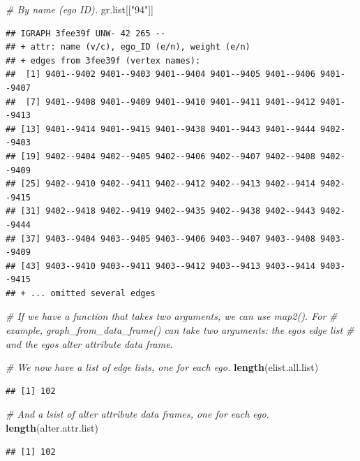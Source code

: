 \documentclass[
]{book}
\newenvironment{Shaded}{\begin{snugshade}}{\end{snugshade}}
\newcommand{\CommentTok}[1]{\textcolor[rgb]{0.56,0.35,0.01}{\textit{#1}}}
\newcommand{\FunctionTok}[1]{\textcolor[rgb]{0.13,0.29,0.53}{\textbf{#1}}}
\newcommand{\NormalTok}[1]{#1}
\newcommand{\StringTok}[1]{\textcolor[rgb]{0.31,0.60,0.02}{#1}}
\begin{document}
\begin{Shaded}
\begin{Highlighting}[]
\CommentTok{\# By name (ego ID).}
\NormalTok{gr.list[[}\StringTok{"94"}\NormalTok{]]}
\end{Highlighting}
\end{Shaded}

\begin{verbatim}
## IGRAPH 3fee39f UNW- 42 265 -- 
## + attr: name (v/c), ego_ID (e/n), weight (e/n)
## + edges from 3fee39f (vertex names):
##  [1] 9401--9402 9401--9403 9401--9404 9401--9405 9401--9406 9401--9407
##  [7] 9401--9408 9401--9409 9401--9410 9401--9411 9401--9412 9401--9413
## [13] 9401--9414 9401--9415 9401--9438 9401--9443 9401--9444 9402--9403
## [19] 9402--9404 9402--9405 9402--9406 9402--9407 9402--9408 9402--9409
## [25] 9402--9410 9402--9411 9402--9412 9402--9413 9402--9414 9402--9415
## [31] 9402--9418 9402--9419 9402--9435 9402--9438 9402--9443 9402--9444
## [37] 9403--9404 9403--9405 9403--9406 9403--9407 9403--9408 9403--9409
## [43] 9403--9410 9403--9411 9403--9412 9403--9413 9403--9414 9403--9415
## + ... omitted several edges
\end{verbatim}

\begin{Shaded}
\begin{Highlighting}[]
\CommentTok{\# If we have a function that takes two arguments, we can use map2(). For}
\CommentTok{\# example, graph\_from\_data\_frame() can take two arguments: the ego\textquotesingle{}s edge list}
\CommentTok{\# and the ego\textquotesingle{}s alter attribute data frame. }

\CommentTok{\# We now have a list of edge lists, one for each ego.}
\FunctionTok{length}\NormalTok{(elist.all.list)}
\end{Highlighting}
\end{Shaded}

\begin{verbatim}
## [1] 102
\end{verbatim}

\begin{Shaded}
\begin{Highlighting}[]
\CommentTok{\# And a lsist of alter attribute data frames, one for each ego.}
\FunctionTok{length}\NormalTok{(alter.attr.list)}
\end{Highlighting}
\end{Shaded}

\begin{verbatim}
## [1] 102
\end{verbatim}
\end{document}
